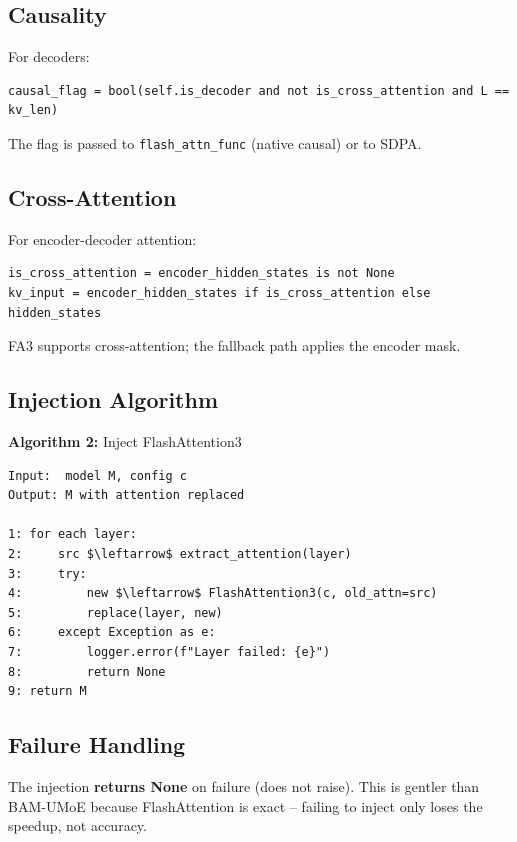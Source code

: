 \subsection{Causality}

For decoders:

\begin{lstlisting}
causal_flag = bool(self.is_decoder and not is_cross_attention and L == kv_len)
\end{lstlisting}

The flag is passed to \texttt{flash\_attn\_func} (native causal) or to SDPA.

\subsection{Cross-Attention}

For encoder-decoder attention:

\begin{lstlisting}
is_cross_attention = encoder_hidden_states is not None
kv_input = encoder_hidden_states if is_cross_attention else hidden_states
\end{lstlisting}

FA3 supports cross-attention; the fallback path applies the encoder mask.

\subsection{Injection Algorithm}

\textbf{Algorithm 2:} Inject FlashAttention3
\begin{lstlisting}
Input:  model M, config c
Output: M with attention replaced

1: for each layer:
2:     src $\leftarrow$ extract_attention(layer)
3:     try:
4:         new $\leftarrow$ FlashAttention3(c, old_attn=src)
5:         replace(layer, new)
6:     except Exception as e:
7:         logger.error(f"Layer failed: {e}")
8:         return None
9: return M
\end{lstlisting}

\subsection{Failure Handling}

The injection \textbf{returns None} on failure (does not raise). This is gentler 
than BAM-UMoE because FlashAttention is exact -- failing to inject only 
loses the speedup, not accuracy.

